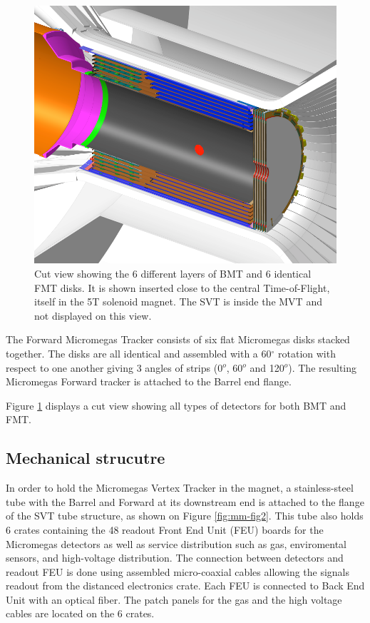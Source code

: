 \begin{figure}[htb]
 \includegraphics[width=1.0\columnwidth,keepaspectratio]{images/fig1}
 \caption{Cut view showing the 6 different layers of BMT and 6 identical FMT disks. It is shown inserted close to the central Time-of-Flight, itself in the 5T solenoid magnet. The SVT is inside the MVT and not displayed on this view.}
 \label{fig:mm-fig1}
\end{figure}

The Forward Micromegas Tracker consists of six flat Micromegas disks stacked together. The disks are all identical and assembled with a 60$^{\circ}$ rotation with respect to one another giving 3 angles of strips (0$^o$, 60$^o$ and 120$^o$). The resulting Micromegas Forward tracker is attached to the Barrel end flange. 

Figure \ref{fig:mm-fig1} displays a cut view showing all types of detectors for both BMT and FMT.

\subsection{Mechanical strucutre}
In order to hold the Micromegas Vertex Tracker in the magnet, a stainless-steel tube with the Barrel and Forward at its downstream end is attached to the flange of the SVT tube structure, as shown on Figure \ref{fig:mm-fig2}. This tube also holds 6 crates containing the 48 readout Front End Unit (FEU) boards for the Micromegas detectors as well as service distribution such as gas, enviromental sensors, and high-voltage distribution. The connection between detectors and readout FEU is done using assembled micro-coaxial cables allowing the signals readout from the distanced electronics crate. Each FEU is connected to Back End Unit with an optical fiber. The patch panels for the gas and the high voltage cables are located on the 6 crates.

